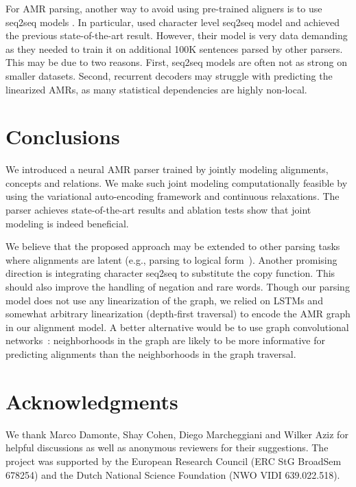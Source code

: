 \documentclass[11pt,a4paper]{article}
\begin{document}
For AMR parsing, another way to avoid using pre-trained aligners is to use seq2seq models \cite{konstas-EtAl:2017:Long,Character}. In particular,  used character level seq2seq model and achieved the previous state-of-the-art result. However, their model is very data demanding as they needed to train it on additional 100K  sentences parsed by other parsers. 
This may be due to two reasons. First, seq2seq models are often not as strong on smaller datasets. Second, recurrent decoders may struggle with predicting the linearized AMRs, as many statistical dependencies are highly non-local. 


\section{Conclusions}
We introduced a neural AMR parser trained by jointly modeling alignments, concepts and relations. We make such joint modeling computationally feasible by using the variational auto-encoding framework and continuous relaxations.  
The parser achieves state-of-the-art results and ablation tests show that joint modeling is indeed beneficial. 

We believe that the proposed approach may be extended to other parsing tasks where alignments are latent (e.g., parsing to logical form~\cite{liang2016learning}). Another promising direction is integrating character seq2seq to substitute the copy function. This should also improve the handling of negation and rare words.
Though our parsing model does not use any linearization of the graph, we relied on LSTMs and somewhat arbitrary linearization (depth-first traversal) 
to encode the AMR graph in our alignment model. A better alternative would be to use graph convolutional networks~\cite{marcheggiani2017encoding,kipf2017semi}: neighborhoods in the graph are likely to be more informative for predicting alignments  than  the neighborhoods in the graph traversal.

\section*{Acknowledgments}
We thank Marco Damonte, Shay Cohen, Diego Marcheggiani and Wilker Aziz for helpful discussions as well as anonymous reviewers for their 
suggestions. The project was supported by the
European Research Council (ERC StG BroadSem
678254) and the Dutch National Science Foundation
(NWO VIDI 639.022.518).


\onecolumn 
\section*{\LARGE{}}
\vspace{4cm}
\end{document}
